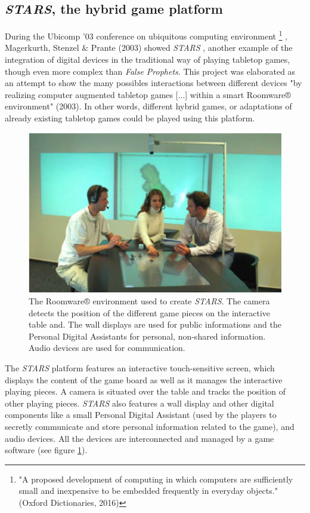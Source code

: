 \subsection{\textit{STARS}, the hybrid game platform}
During the Ubicomp '03 conference on ubiquitous computing environment
\footnote{"A proposed development of computing in which computers are sufficiently small and inexpensive to be embedded frequently in everyday objects."(Oxford Dictionaries, 2016)}
, Magerkurth, Stenzel \& Prante (2003) showed \textit{STARS} \cite{art:stars}, another example of the integration of digital devices in the traditional way of playing tabletop games, though even more complex than \textit{False Prophets}. This project was elaborated as an attempt to show the many possibles interactions between different devices "by realizing computer augmented tabletop games [...] within a smart Roomware® environment" (2003)\cite{art:stars}. In other words, different hybrid games, or adaptations of already existing tabletop games could be played using this platform.

\begin{figure}[!ht]
    \centering
    \includegraphics[scale=0.4]{Images/roomware.png}
    \caption{The Roomware® environment used to create \textit{STARS}. The camera detects the position of the different game pieces on the interactive table and. The wall displays are used for public informations and the Personal Digital Assistants for personal, non-shared information. Audio devices are used for communication.}
    \label{fig:roomware}
\end{figure}

The \textit{STARS} platform features an interactive touch-sensitive screen, which displays the content of the game board as well as it manages the interactive playing pieces. A camera is situated over the table and tracks the position of other playing pieces. \textit{STARS} also features a wall display and other digital components like a small Personal Digital Assistant (used by the players to secretly communicate and store personal information related to the game), and audio devices. All the devices are interconnected and managed by a game software (see figure \ref{fig:roomware}). 

